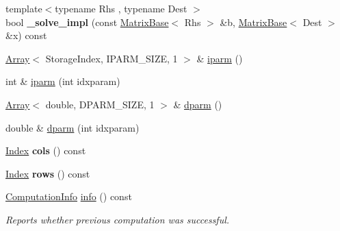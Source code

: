 \begin{DoxyCompactItemize}
\mbox{\label{class_eigen_1_1_pastix_base_a45143cfc3f90b030c0d900b86de91408}} 
{\footnotesize template$<$typename Rhs , typename Dest $>$ }\\bool {\bfseries \+\_\+solve\+\_\+impl} (const \hyperlink{group___core___module_class_eigen_1_1_matrix_base}{Matrix\+Base}$<$ Rhs $>$ \&b, \hyperlink{group___core___module_class_eigen_1_1_matrix_base}{Matrix\+Base}$<$ Dest $>$ \&x) const
\item 
\hyperlink{group___core___module_class_eigen_1_1_array}{Array}$<$ Storage\+Index, I\+P\+A\+R\+M\+\_\+\+S\+I\+ZE, 1 $>$ \& \hyperlink{class_eigen_1_1_pastix_base_a38378e7b2b5c750a8a23e2c21a69146c}{iparm} ()
\item 
int \& \hyperlink{class_eigen_1_1_pastix_base_a5509ca8d6a9217fb95ab020363b9e0fb}{iparm} (int idxparam)
\item 
\hyperlink{group___core___module_class_eigen_1_1_array}{Array}$<$ double, D\+P\+A\+R\+M\+\_\+\+S\+I\+ZE, 1 $>$ \& \hyperlink{class_eigen_1_1_pastix_base_af4a29373aa3e6a980738efde33f92a76}{dparm} ()
\item 
double \& \hyperlink{class_eigen_1_1_pastix_base_a6e7baecd4990d6df9b5713cb6499e940}{dparm} (int idxparam)
\item 
\mbox{\label{class_eigen_1_1_pastix_base_a6ba5c02c8b13ad144a96f9fb6a5885e5}} 
\hyperlink{namespace_eigen_a62e77e0933482dafde8fe197d9a2cfde}{Index} {\bfseries cols} () const
\item 
\mbox{\label{class_eigen_1_1_pastix_base_a01b3786f9c460d32284fe63655f29109}} 
\hyperlink{namespace_eigen_a62e77e0933482dafde8fe197d9a2cfde}{Index} {\bfseries rows} () const
\item 
\hyperlink{group__enums_ga85fad7b87587764e5cf6b513a9e0ee5e}{Computation\+Info} \hyperlink{class_eigen_1_1_pastix_base_a436e99a385c9c019be9627cc1fa884cf}{info} () const
\begin{DoxyCompactList}\small\item\em Reports whether previous computation was successful. \end{DoxyCompactList}\end{DoxyCompactItemize}
